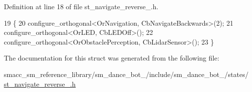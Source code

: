 Definition at line 18 of file st\+\_\+navigate\+\_\+reverse\+\_.\+h.


\begin{DoxyCode}
19    \{
20       configure\_orthogonal<OrNavigation, CbNavigateBackwards>(2);
21       configure\_orthogonal<OrLED, CbLEDOff>();
22       configure\_orthogonal<OrObstaclePerception, CbLidarSensor>();
23    \}
\end{DoxyCode}


The documentation for this struct was generated from the following file\+:\begin{DoxyCompactItemize}
\item 
smacc\+\_\+sm\+\_\+reference\+\_\+library/sm\+\_\+dance\+\_\+bot\+\_/include/sm\+\_\+dance\+\_\+bot\+\_/states/\hyperlink{3_2include_2sm__dance__bot__3_2states_2st__navigate__reverse__2_8h}{st\+\_\+navigate\+\_\+reverse\+\_.\+h}\end{DoxyCompactItemize}
